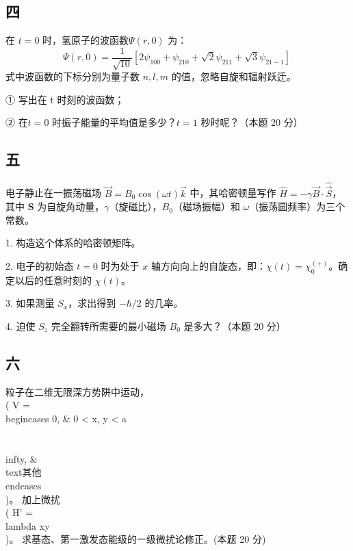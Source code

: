 \subsection{四}
在 $t = 0 $ 时，氢原子的波函数$\Psi(r, 0)$ 为：$$\Psi(r, 0) = \frac{1}{\sqrt{10}} \left[ 2\psi_{100} + \psi_{210} + \sqrt{2}\psi_{211} + \sqrt{3}\psi_{21-1} \right]~$$
式中波函数的下标分别为量子数 $ n, l, m $ 的值，忽略自旋和辐射跃迁。

①  写出在 t 时刻的波函数；

② 在$ t = 0$ 时振子能量的平均值是多少？$t = 1$ 秒时呢？（本题 20 分）

\subsection{五}
电子静止在一振荡磁场 $\vec{B} = B_0 \cos(\omega t) {\vec{k}}$ 中，其哈密顿量写作 $\hat{H} = - \gamma \vec{B} \cdot \hat{\vec S}$，其中 $\mathbf{S}$ 为自旋角动量，$\gamma$（旋磁比），$B_0$（磁场振幅）和 $\omega$（振荡圆频率）为三个常数。

1. 构造这个体系的哈密顿矩阵。

2. 电子的初始态 $t = 0$ 时为处于 $x$ 轴方向向上的自旋态，即：$\chi (t) = \chi_{0}^{(+)}$。确定以后的任意时刻的 $\chi (t)$。

3. 如果测量 $S_x$，求出得到 $- \hbar / 2$ 的几率。

4. 迫使 $S_z$ 完全翻转所需要的最小磁场 $B_0$ 是多大？（本题 20 分）

\subsection{六}
粒子在二维无限深方势阱中运动，\\( V = \\begin{cases} 0, & 0 < x, y < a \\\\ \\infty, & \\text{其他}\\end{cases} \\)。 加上微扰 \\( H' = \\lambda xy \\)。 求基态、第一激发态能级的一级微扰论修正。(本题 20 分)
